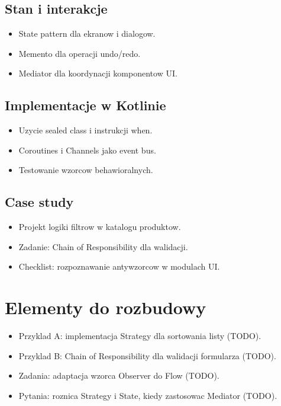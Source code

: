 \subsection{Stan i interakcje}
\begin{itemize}
  \item State pattern dla ekranow i dialogow.
  \item Memento dla operacji undo/redo.
  \item Mediator dla koordynacji komponentow UI.
\end{itemize}

\subsection{Implementacje w Kotlinie}
\begin{itemize}
  \item Uzycie sealed class i instrukcji when.
  \item Coroutines i Channels jako event bus.
  \item Testowanie wzorcow behawioralnych.
\end{itemize}

\subsection{Case study}
\begin{itemize}
  \item Projekt logiki filtrow w katalogu produktow.
  \item Zadanie: Chain of Responsibility dla walidacji.
  \item Checklist: rozpoznawanie antywzorcow w modulach UI.
\end{itemize}

\section{Elementy do rozbudowy}
\begin{itemize}
  \item Przyklad A: implementacja Strategy dla sortowania listy (TODO).
  \item Przyklad B: Chain of Responsibility dla walidacji formularza (TODO).
  \item Zadania: adaptacja wzorca Observer do Flow (TODO).
  \item Pytania: roznica Strategy i State, kiedy zastosowac Mediator (TODO).
\end{itemize}

